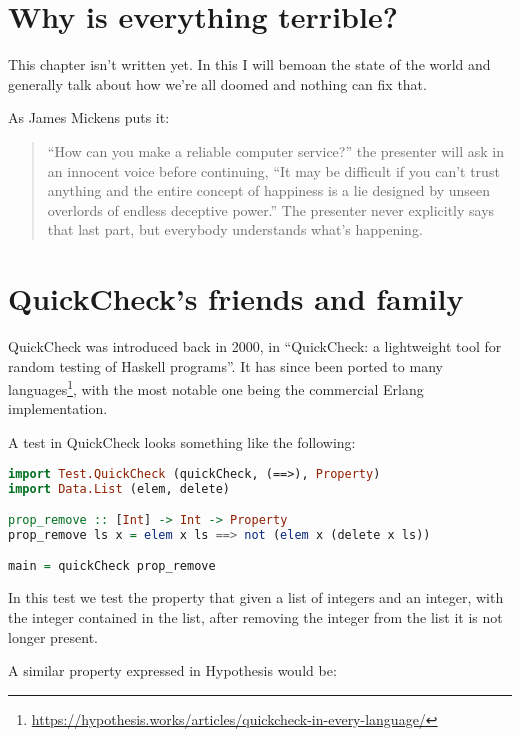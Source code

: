 \chapter{Why is everything terrible?}

This chapter isn't written yet.
In this I will bemoan the state of the world and generally talk about how we're all doomed and nothing can fix that.

As James Mickens puts it\cite{mickens2014saddest}:

\begin{quote}
``How can you make a reliable computer service?'' the presenter will ask in an innocent voice before continuing,
``It may be difficult if you can’t trust anything and the entire concept of happiness is a lie designed by unseen overlords of endless deceptive power.''
The presenter never explicitly says that last part,
but everybody understands what's happening.
\end{quote}

\chapter{QuickCheck's friends and family}\label{chap:quickcheck}

QuickCheck was introduced back in 2000,
in ``QuickCheck: a lightweight tool for random testing of Haskell programs''\cite{DBLP:conf/icfp/ClaessenH00}.
It has since been ported to many languages\footnote{\url{https://hypothesis.works/articles/quickcheck-in-every-language/}},
with the most notable one being the commercial Erlang implementation\cite{DBLP:conf/erlang/ArtsHJW06}.

A test in QuickCheck looks something like the following:

\begin{lstlisting}[language=Haskell]
import Test.QuickCheck (quickCheck, (==>), Property)
import Data.List (elem, delete)

prop_remove :: [Int] -> Int -> Property
prop_remove ls x = elem x ls ==> not (elem x (delete x ls))

main = quickCheck prop_remove
\end{lstlisting}

In this test we test the property that given a list of integers and an integer,
with the integer contained in the list,
after removing the integer from the list it is not longer present.

A similar property expressed in Hypothesis would be:

